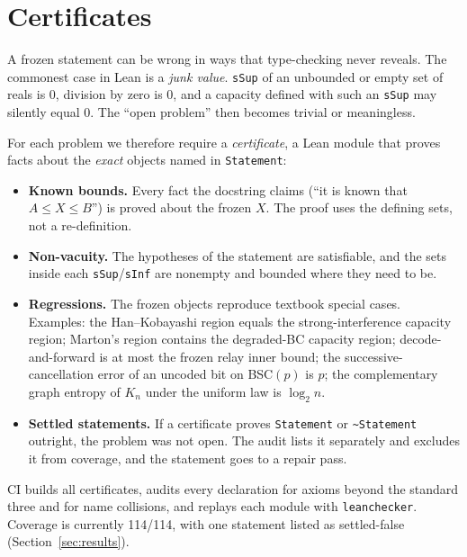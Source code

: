 \documentclass[11pt]{article}
\newcommand{\code}[1]{\texttt{#1}}
\begin{document}
\section{Certificates}\label{sec:cert}

A frozen statement can be wrong in ways that type-checking never reveals. The commonest case in
Lean is a \emph{junk value}. \code{sSup} of an unbounded or empty set of reals is $0$, division
by zero is $0$, and a capacity defined with such an \code{sSup} may silently equal $0$. The
``open problem'' then becomes trivial or meaningless.

For each problem we therefore require a \emph{certificate}, a Lean module that proves facts about
the \emph{exact} objects named in \code{Statement}:
\begin{itemize}[leftmargin=*,itemsep=2pt]
\item \textbf{Known bounds.} Every fact the docstring claims (``it is known that $A\le X\le B$'')
is proved about the frozen $X$. The proof uses the defining sets, not a re-definition.
\item \textbf{Non-vacuity.} The hypotheses of the statement are satisfiable, and the sets inside
each \code{sSup}/\code{sInf} are nonempty and bounded where they need to be.
\item \textbf{Regressions.} The frozen objects reproduce textbook special cases. Examples: the
Han--Kobayashi region equals the strong-interference capacity region; Marton's region contains
the degraded-BC capacity region; decode-and-forward is at most the frozen relay inner bound; the
successive-cancellation error of an uncoded bit on BSC$(p)$ is $p$; the complementary graph
entropy of $K_n$ under the uniform law is $\log_2 n$.
\item \textbf{Settled statements.} If a certificate proves \code{Statement} or
\code{\textasciitilde Statement} outright, the problem was not open. The audit lists it
separately and excludes it from coverage, and the statement goes to a repair pass.
\end{itemize}
CI builds all certificates, audits every declaration for axioms beyond the standard three and for
name collisions, and replays each module with \code{leanchecker}. Coverage is currently 114/114,
with one statement listed as settled-false (Section~\ref{sec:results}).
\end{document}
